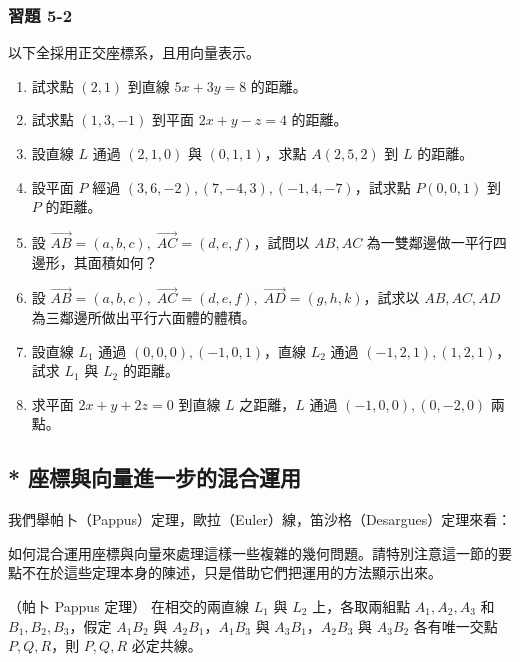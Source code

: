 \subsubsection*{習題 5-2}
以下全採用正交座標系，且用向量表示。
\begin{enumerate}[leftmargin=2em]
  \item 試求點 $(2, 1)$ 到直線 $5x + 3y = 8$ 的距離。
  \item 試求點 $(1, 3, -1)$ 到平面 $2x + y - z = 4$ 的距離。
  \item 設直線 $L$ 通過 $(2, 1, 0)$ 與 $(0, 1, 1)$，求點 $A(2, 5, 2)$ 到 $L$ 的距離。
  \item 設平面 $P$ 經過 $(3, 6, -2), (7, -4, 3), (-1, 4, -7)$，試求點 $P(0, 0, 1)$ 到 $P$ 的距離。
  \item 設 $\vec{AB} = (a, b, c),\; \vec{AC} = (d, e, f)$，試問以 $AB, AC$ 為一雙鄰邊做一平行四邊形，其面積如何？
  \item 設 $\vec{AB} = (a, b, c),\; \vec{AC} = (d, e, f),\; \vec{AD} = (g, h, k)$，試求以 $AB, AC, AD$ 為三鄰邊所做出平行六面體的體積。
  \item 設直線 $L_1$ 通過 $(0, 0, 0), (-1, 0, 1)$，直線 $L_2$ 通過 $(-1, 2, 1), (1, 2, 1)$，試求 $L_1$ 與 $L_2$ 的距離。
  \item 求平面 $2x + y + 2z = 0$ 到直線 $L$ 之距離，$L$ 通過 $(-1, 0, 0), (0, -2, 0)$ 兩點。
\end{enumerate}

\subsection{* 座標與向量進一步的混合運用}\label{sec:b3s-5-3}

我們舉帕卜（Pappus）定理，歐拉（Euler）線，笛沙格（Desargues）定理來看：

如何混合運用座標與向量來處理這樣一些複雜的幾何問題。請特別注意這一節的要點不在於這些定理本身的陳述，只是借助它們把運用的方法顯示出來。

\begin{example}[論例 4]（帕卜 Pappus 定理）
在相交的兩直線 $L_1$ 與 $L_2$ 上，各取兩組點 $A_1, A_2, A_3$ 和 $B_1, B_2, B_3$，假定 $A_1B_2$ 與 $A_2B_1$，$A_1B_3$ 與 $A_3B_1$，$A_2B_3$ 與 $A_3B_2$ 各有唯一交點 $P, Q, R$，則 $P, Q, R$ 必定共線。
\end{example}

